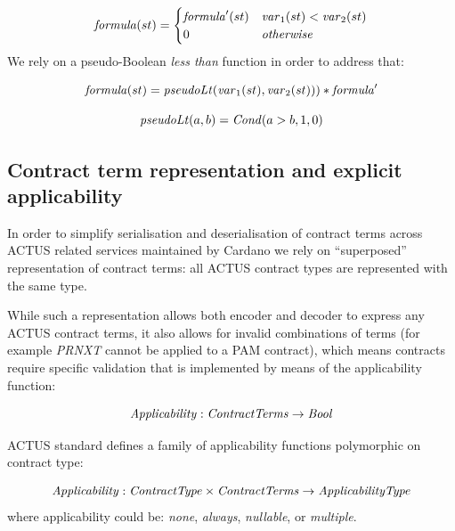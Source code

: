 \documentclass[runningheads]{llncs}
\newcommand{\ident}[1]{\mbox{\emph{#1}}}
\begin{document}
\begin{equation}
\ident{formula}(st)=\begin{cases}
\ident{formula}^\prime(st) & \ident{var}_1(st)<\ident{var}_2(st)\\
0 & \ident{otherwise}
\end{cases}
\end{equation}
We rely on a pseudo-Boolean \emph{less than} function in order to address
that:

\noindent 
\begin{equation}
\ident{formula}(st)=\ident{pseudoLt}(\ident{var}_1(st),\ident{var}_2(st)))*\ident{formula}^\prime
\end{equation}

\noindent 
\begin{equation}
\ident{pseudoLt}(a,b)=\ident{Cond}(a>b,1,0)
\end{equation}


\subsection{Contract term representation and explicit applicability}

In order to simplify serialisation and deserialisation of contract terms
across ACTUS related services maintained by Cardano we rely on ``superposed''
representation of contract terms: all ACTUS contract types are represented
with the same type. 

While such a representation allows both encoder
and decoder to express any ACTUS contract terms, it also allows for
invalid combinations of terms (for example \emph{PRNXT} cannot be applied
to a PAM contract), which means contracts require specific validation
that is implemented by means of the applicability function:

\noindent 
\begin{equation}
\ident{Applicability}:\ident{ContractTerms}\rightarrow \ident{Bool}
\end{equation}

ACTUS standard defines a family of applicability functions polymorphic on contract
type:

\smallskip
\noindent 
\begin{equation}
\ident{Applicability} : \ident{ContractType} \times \ident{ContractTerms} \rightarrow \ident{ApplicabilityType}
\end{equation}
\noindent
where applicability could be: \emph{none}, \emph{always}, \emph{nullable}, or \emph{multiple}.
\end{document}
